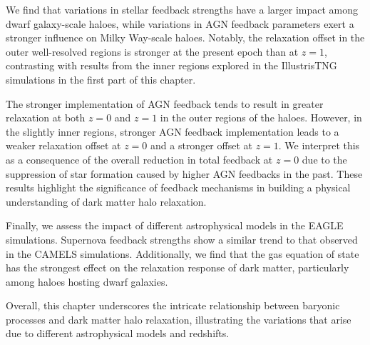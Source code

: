 We find that variations in stellar feedback strengths have a larger impact among dwarf galaxy-scale haloes, while variations in AGN feedback parameters exert a stronger influence on Milky Way-scale haloes. Notably, the relaxation offset in the outer well-resolved regions is stronger at the present epoch than at \( z=1 \), contrasting with results from the inner regions explored in the IllustrisTNG simulations in the first part of this chapter.

The stronger implementation of AGN feedback tends to result in greater relaxation at both \( z=0 \) and \( z=1 \) in the outer regions of the haloes. However, in the slightly inner regions, stronger AGN feedback implementation leads to a weaker relaxation offset at \( z=0 \) and a stronger offset at \( z=1 \). We interpret this as a consequence of the overall reduction in total feedback at \( z=0 \) due to the suppression of star formation caused by higher AGN feedbacks in the past. These results highlight the significance of feedback mechanisms in building a physical understanding of dark matter halo relaxation.

Finally, we assess the impact of different astrophysical models in the EAGLE simulations. Supernova feedback strengths show a similar trend to that observed in the CAMELS simulations. Additionally, we find that the gas equation of state has the strongest effect on the relaxation response of dark matter, particularly among haloes hosting dwarf galaxies.

Overall, this chapter underscores the intricate relationship between baryonic processes and dark matter halo relaxation, illustrating the variations that arise due to different astrophysical models and redshifts.